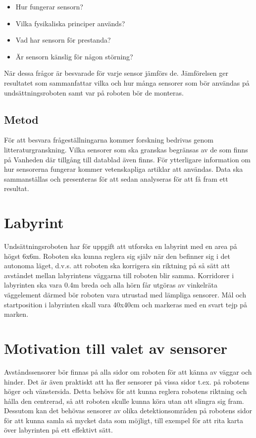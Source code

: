 \documentclass[11pt]{article}
\begin{document}
\begin{flushleft}
\begin{itemize}

\item Hur fungerar sensorn?

\item Vilka fysikaliska principer används?

\item Vad har sensorn för prestanda?

\item Är sensorn känslig för någon störning?

\end{itemize}


När dessa frågor är besvarade för varje sensor jämförs de. Jämförelsen ger resultatet som sammanfattar vilka och hur många sensorer som bör användas på undsättningsroboten samt var på roboten bör de monteras.


 \subsection{Metod}
För att besvara frågeställningarna kommer forskning bedrivas genom litteraturgranskning. Vilka sensorer som ska granskas begränsas av de som finns på Vanheden där tillgång till datablad även finns. För ytterligare information om hur sensorerna fungerar kommer vetenskapliga artiklar att användas. Data ska sammanställas och presenteras för att sedan analyseras för att få fram ett resultat.

\section{Labyrint}
Undsättningsroboten har för uppgift att utforska en labyrint med en area på högst 6x6m. Roboten ska kunna reglera sig själv när den befinner sig i det autonoma läget, d.v.s. att roboten ska korrigera sin riktning på så sätt att avståndet mellan labyrintens väggarna till roboten blir samma. Korridorer i labyrinten ska vara 0.4m breda och alla hörn får utgöras av vinkelräta väggelement därmed bör roboten vara utrustad med lämpliga sensorer. Mål och startposition i labyrinten skall vara 40x40cm och markeras med en svart tejp på marken.

\section{Motivation till valet av sensorer}
Avståndssensorer bör finnas på alla sidor om roboten för att känna av väggar och hinder. Det är även praktiskt att ha fler sensorer på vissa sidor t.ex. på robotens höger och vänstersida. Detta behövs för att kunna reglera robotens riktning och hålla den centrerad, så att roboten skulle kunna köra utan att slingra sig fram. Dessutom kan det behövas sensorer av olika detektionsområden på robotens sidor för att kunna samla så mycket data som möjligt, till exempel för att rita karta över labyrinten på ett effektivt sätt. 
\\[0.1in]


\end{flushleft}
\end{document}
